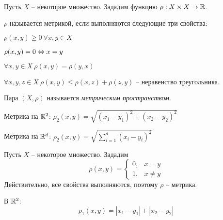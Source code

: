 


    \Header

    \BeginConspect


    Пусть $X$ -- некоторое множество. Зададим функцию $\rho : X \times X \to \mathbb{R}$.
    \begin{Def}[Метрика]
        $\rho$ называется метрикой, если выполняются следующие три свойства:
        \begin{MyList}
            \item $\rho (x, y) \geqslant 0 \ \forall x, y \in X$
            \item[] $\rho(x, y) = 0 \Leftrightarrow x = y$
            \item $\forall x, y \in X \ \rho (x, y) = \rho (y, x)$ 
            \item $\forall x, y, z \in X \ \rho (x, y) \leqslant \rho(x, z) + \rho(z, y)$ -- неравенство треугольника. 
        \end{MyList}
    \end{Def} 

    \begin{Def}
        Пара $(X, \rho)$ называется \textit{метрическим пространством}.
    \end{Def}

    \begin{Example}
        Метрика на $\mathbb{R}^2$: $\rho_2 (x, y) = \sqrt{(x_1 - y_1)^2 + (x_2 - y_2)^2}$ 
    \end{Example}

    \begin{Example}
        Метрика на $\mathbb{R}^d$: $\rho_2 (x, y) = \sqrt{\sum_{i=1}^{d} (x_i - y_i)^2}$ 
    \end{Example}

    \begin{Example}
        Пусть $X$ -- некоторое множество. Зададим 
        \[\rho (x, y) = \begin{cases}
            0, &x = y \\
            1, &x\neq y
        \end{cases}\]
        Действительно, все свойства выполняются, поэтому $\rho$ -- метрика.
    \end{Example}

    \begin{Example}
        В $\mathbb{R}^2$:
        \[\rho_1(x, y) = |x_1 - y_1| + |x_2 - y_2|\]

        \begin{figure}[H]
            \centering
            \def\svgwidth{.3\columnwidth}
            
        \end{figure}
    \end{Example}


